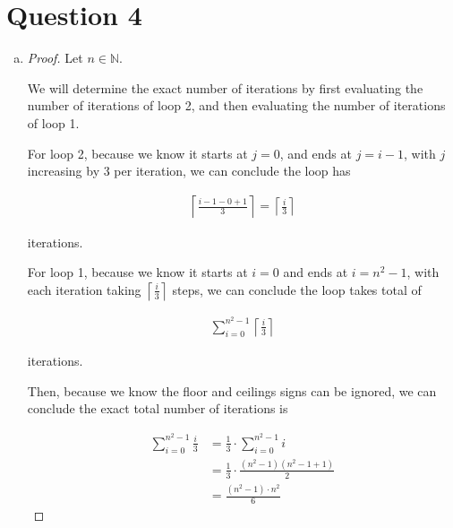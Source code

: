 \documentclass[12pt]{article}
\begin{document}
\section*{Question 4}
\begin{enumerate}[a.]
    \item

    \begin{proof}
        Let $n \in \mathbb{N}$.

        \bigskip

        We will determine the exact number of iterations by first evaluating the
        number of iterations of loop 2, and then evaluating the number of iterations
        of loop 1.

        \bigskip

        For loop 2, because we know it starts at $j = 0$, and ends at $j = i - 1$,
        with $j$ increasing by 3 per iteration, we can conclude the loop has

        \setcounter{equation}{0}
        \begin{align}
            \left\lceil \frac{i-1-0+1}{3} \right\rceil = \left\lceil \frac{i}{3} \right\rceil
        \end{align}

        iterations.

        \bigskip

        For loop 1, because we know it starts at $i = 0$ and ends at $i = n^2-1$,
        with each iteration taking $\left\lceil \frac{i}{3} \right\rceil$
        steps, we can conclude the loop takes total of

        \begin{align}
            \sum\limits_{i=0}^{n^2-1} \left\lceil \frac{i}{3} \right\rceil
        \end{align}

        iterations.

        \bigskip

        Then, because we know the floor and ceilings signs can be ignored,
        we can conclude the exact total number of iterations is

        \begin{align}
            \sum\limits_{i=0}^{n^2-1} \frac{i}{3} &= \frac{1}{3} \cdot \sum\limits_{i=0}^{n^2-1} i\\
            &= \frac{1}{3} \cdot \frac{(n^2 - 1)(n^2 -1 + 1)}{2}\\
            &= \frac{(n^2 - 1) \cdot n^2}{6}
        \end{align}
    \end{proof}


\end{enumerate}
\end{document}
